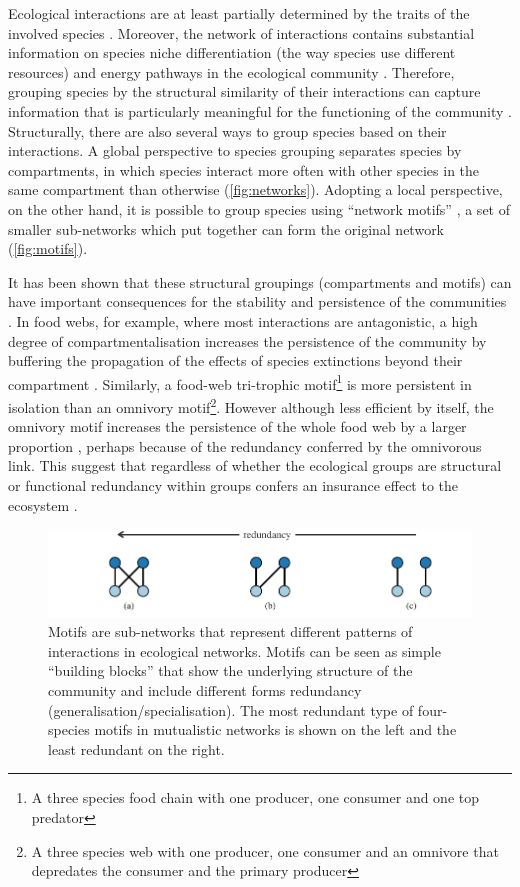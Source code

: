 \documentclass[a4paper]{article}
\begin{document}
Ecological interactions are at least partially determined by the traits of the involved species \autocite{Cohen1993, Stang2009, Edwards2011}.
Moreover, the network of interactions contains substantial information on species niche differentiation (the way species use different resources) and energy pathways in the ecological community \autocite{Gauzens2014}.
Therefore, grouping species by the structural similarity of their interactions can capture information that is particularly meaningful for the functioning of the community \autocite{Thebault2010, Stouffer2011}.
Structurally, there are also several ways to group species based on their interactions.
A global perspective to species grouping separates species by compartments, in which species interact more often with other species in the same compartment than otherwise (\autoref{fig:networks}).
Adopting a local perspective, on the other hand, it is possible to group species using ``network motifs'' \autocite{Holt2001, Milo2002, Stouffer2007a}, a set of smaller sub-networks which put together can form the original network (\autoref{fig:motifs}).

It has been shown that these structural groupings (compartments and motifs) can have important consequences for the stability and persistence of the communities \autocite{Neutel2002, Kondoh2008, Thebault2010, Stouffer2010, Stouffer2011}.
In food webs, for example, where most interactions are antagonistic, a high degree of compartmentalisation increases the persistence of the community by buffering the propagation of the effects of species extinctions beyond their compartment \autocite{Stouffer2011}.
Similarly, a food-web tri-trophic motif\footnote{A three species food chain with one producer, one consumer and one top predator} is more persistent in isolation than an omnivory motif\footnote{A three species web with one producer, one consumer and an omnivore that depredates the consumer and the primary producer}.
However although less efficient by itself, the omnivory motif increases the persistence of the whole food web by a larger proportion \autocite{Stouffer2010}, perhaps because of the redundancy conferred by the omnivorous link.
This suggest that regardless of whether the ecological groups are structural or functional redundancy within groups confers an insurance effect to the ecosystem \autocite{Walker1992}.

\begin{figure}[tbp]
  \centering
  \includegraphics{motifs}
  \caption{
  \label{fig:motifs}
  Motifs are sub-networks that represent different patterns of interactions in ecological networks.
  Motifs can be seen as simple “building blocks” that show the underlying structure of the community and include different forms redundancy (generalisation/specialisation).
  The most redundant type of four-species motifs in mutualistic networks is shown on the left and the least redundant on the right.
  }
\end{figure}
\end{document}
